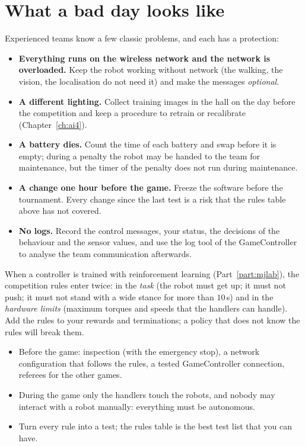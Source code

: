 \section*{What a bad day looks like}
Experienced teams know a few classic problems, and each has a protection:
\begin{itemize}[nosep]
 \item \textbf{Everything runs on the wireless network and the network is overloaded.} Keep the robot working without network (the walking, the vision, the localisation do not need it) and make the messages \emph{optional}.
 \item \textbf{A different lighting.} Collect training images in the hall on the day before the competition and keep a procedure to retrain or recalibrate (Chapter~\ref{ch:ai4}).
 \item \textbf{A battery dies.} Count the time of each battery and swap before it is empty; during a penalty the robot may be handed to the team for maintenance, but the timer of the penalty does not run during maintenance.
 \item \textbf{A change one hour before the game.} Freeze the software before the tournament. Every change since the last test is a risk that the rules table above has not covered.
 \item \textbf{No logs.} Record the control messages, your status, the decisions of the behaviour and the sensor values, and use the log tool of the GameController to analyse the team communication afterwards.
\end{itemize}

\begin{aibox}
When a controller is trained with reinforcement learning (Part~\ref{part:mjlab}), the competition rules enter twice: in the \emph{task} (the robot must get up; it must not push; it must not stand with a wide stance for more than $10$\,s) and in the \emph{hardware limits} (maximum torques and speeds that the handlers can handle). Add the rules to your rewards and terminations; a policy that does not know the rules will break them.
\end{aibox}

\begin{keyidea}[Summary]
\begin{itemize}[nosep]
 \item Before the game: inspection (with the emergency stop), a network configuration that follows the rules, a tested GameController connection, referees for the other games.
 \item During the game only the handlers touch the robots, and nobody may interact with a robot manually: everything must be autonomous.
 \item Turn every rule into a test; the rules table is the best test list that you can have.
\end{itemize}
\end{keyidea}

